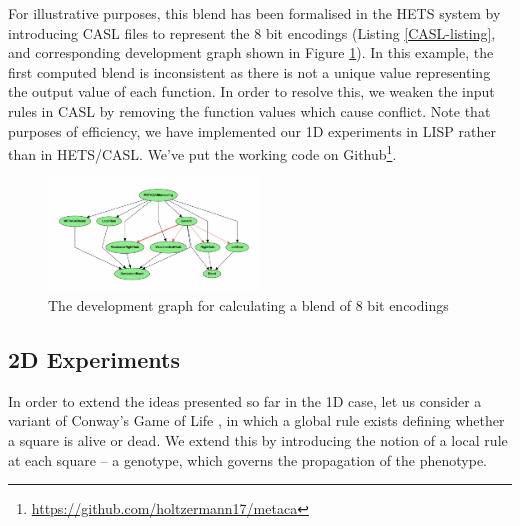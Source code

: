 \documentclass{AISB2008}
\begin{document}
For illustrative purposes, this blend has been formalised in the HETS
system by introducing CASL files to represent the 8 bit encodings
(Listing \ref{CASL-listing}, and corresponding development graph shown
in Figure \ref{fig:hetsblend}).
%
In this example, the first computed blend is inconsistent as there is
not a unique value representing the output value of each function.  In
order to resolve this, we weaken the input rules in CASL by removing
the function values which cause conflict.
%
Note that purposes of efficiency, we have implemented our 1D
experiments in LISP rather than in \mbox{HETS}/\mbox{CASL}.  We've put
the working code on
Github\footnote{\url{https://github.com/holtzermann17/metaca}}.

\begin{figure}[!ht]
\includegraphics[width=0.5\textwidth]{dol_dev.pdf}
\caption{The development graph for calculating a blend of 8 bit encodings\label{fig:hetsblend}}
\end{figure}


\subsection{2D Experiments} \label{2d-experiments-design}



In order to extend the ideas presented so far in the 1D case, let us
consider a variant of Conway's Game of Life \cite{conway}, in which a
global rule exists defining whether a square is alive or dead.  We
extend this by introducing the notion of a local rule at each square
-- a genotype, which governs the propagation of the phenotype.
\end{document}
